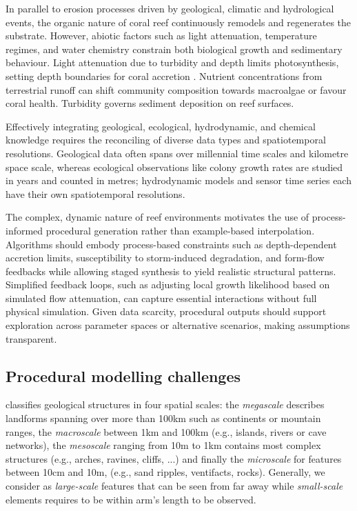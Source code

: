 In parallel to erosion processes driven by geological, climatic and hydrological events, the organic nature of coral reef continuously remodels and regenerates the substrate. However, abiotic factors such as light attenuation, temperature regimes, and water chemistry constrain both biological growth and sedimentary behaviour. Light attenuation due to turbidity and depth limits photosynthesis, setting depth boundaries for coral accretion \cite{Kirk1994}. Nutrient concentrations from terrestrial runoff can shift community composition towards macroalgae or favour coral health. Turbidity governs sediment deposition on reef surfaces.

Effectively integrating geological, ecological, hydrodynamic, and chemical knowledge requires the reconciling of diverse data types and spatiotemporal resolutions. Geological data often spans over millennial time scales and kilometre space scale, whereas ecological observations like colony growth rates are studied in years and counted in metres; hydrodynamic models and sensor time series each have their own spatiotemporal resolutions.

The complex, dynamic nature of reef environments motivates the use of process-informed procedural generation rather than example-based interpolation. Algorithms should embody process-based constraints such as depth-dependent accretion limits, susceptibility to storm-induced degradation, and form-flow feedbacks while allowing staged synthesis to yield realistic structural patterns. Simplified feedback loops, such as adjusting local growth likelihood based on simulated flow attenuation, can capture essential interactions without full physical simulation. Given data scarcity, procedural outputs should support exploration across parameter spaces or alternative scenarios, making assumptions transparent.

\subsection{Procedural modelling challenges}
\cite{ParisThesis} classifies geological structures in four spatial scales: the \emph{megascale} describes landforms spanning over more than 100km such as continents or mountain ranges, the \emph{macroscale} between 1km and 100km (e.g., islands, rivers or cave networks), the \emph{mesoscale} ranging from 10m to 1km contains most complex structures (e.g., arches, ravines, cliffs, ...) and finally the \emph{microscale} for features between 10cm and 10m, (e.g., sand ripples, ventifacts, rocks). Generally, we consider as \emph{large-scale} features that can be seen from far away while \emph{small-scale} elements requires to be within arm's length to be observed.


